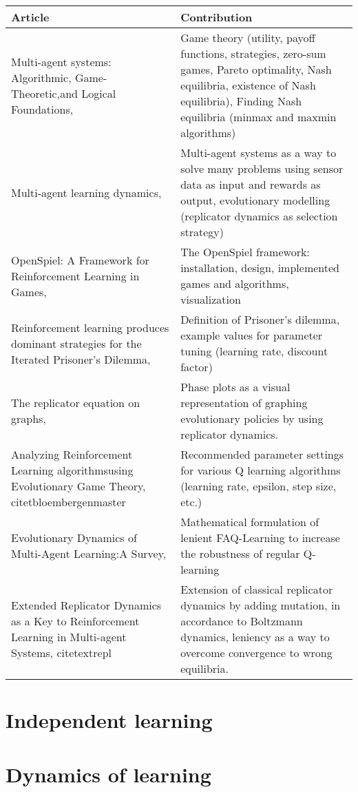 \documentclass[10pt,a4paper]{article}
\begin{document}
\bigskip
\begin{tabular}{|p{4cm}|p{9cm}|}
\hline 
Article & Contribution \\ 
\hline 
\hline
Multi-agent systems: Algorithmic, Game-Theoretic,and Logical Foundations, \citet{mas} & Game theory  (utility, payoff functions, strategies, zero-sum games, Pareto optimality, Nash equilibria, existence of Nash equilibria), Finding Nash equilibria (minmax and maxmin algorithms)  \\ 
\hline 
Multi-agent learning dynamics, \citet{phdthesis} &  Multi-agent systems as a way to solve many problems using sensor data as input and rewards as output, evolutionary modelling (replicator dynamics as selection strategy) \\
\hline 
OpenSpiel: A Framework for Reinforcement Learning in Games, \citet{lanctot2019openspiel} & The OpenSpiel framework: installation, design, implemented games and algorithms, visualization \\ 
\hline 
Reinforcement learning produces dominant strategies for the Iterated Prisoner’s Dilemma, \citet{rlforpd} & Definition of Prisoner's dilemma, example values for parameter tuning (learning rate, discount factor) \\ 
\hline 
The replicator equation on graphs, \citet{Ohtsuki2006TheRE} & Phase plots as a visual representation of graphing evolutionary policies by using replicator dynamics. \\
\hline
Analyzing Reinforcement Learning algorithmsusing Evolutionary Game Theory, citet{bloembergenmaster} & Recommended parameter settings for various Q learning algorithms (learning rate, epsilon, step size, etc.) \\
\hline
Evolutionary Dynamics of Multi-Agent Learning:A Survey, \citet{evoldynamics} & Mathematical formulation of lenient FAQ-Learning to increase the robustness of regular Q-learning \\
\hline
Extended Replicator Dynamics as a Key to Reinforcement Learning in Multi-agent Systems, citet{extrepl} & Extension of classical replicator dynamics by adding mutation, in accordance to Boltzmann dynamics, leniency as a way to overcome convergence to wrong equilibria.
\end{tabular} 

\section{Independent learning}
\section{Dynamics of learning}


{}

\end{document}
